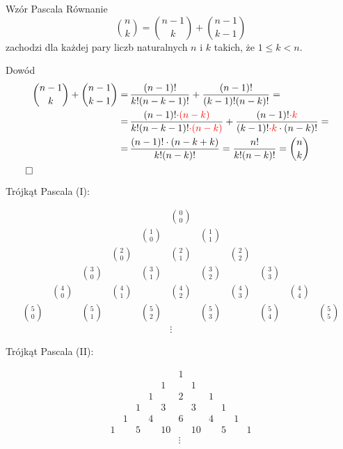 \documentclass[a4paper,10pt]{beamer}
\begin{document}
\begin{frame}

\begin{block}{Wzór Pascala}
Równanie
$${n\choose k}={n-1\choose k}+{n-1\choose k-1}$$
zachodzi dla każdej pary liczb naturalnych $n$ i $k$ takich, że $1\leqslant k<n$.
\end{block}

\begin{block}{Dowód}
\begin{align*}
{n-1\choose k}+{n-1\choose k-1}=&\,\frac{(n-1)!}{k!(n-k-1)!}+\frac{(n-1)!}{(k-1)!(n-k)!}=\\
=&\,\frac{(n-1)!\textcolor{red}{\cdot(n-k)}}{k!(n-k-1)!\textcolor{red}{\cdot(n-k)}}+\frac{(n-1)!\textcolor{red}{\cdot k}}{(k-1)!\textcolor{red}{\cdot k}\cdot(n-k)!}=\\
=&\,\frac{(n-1)!\cdot (n-k+k)}{k!(n-k)!}=\frac{n!}{k!(n-k)!}={n\choose k}\\
\end{align*}\hfill$\qed$
\end{block}

\end{frame}



\begin{frame}
Trójkąt Pascala (I):

$$\begin{array}{ccccccccccc}
&&&&&{0\choose0}&&&&&\\
&&&&{1\choose0}&&{1\choose1}&&&&\\
&&&{2\choose0}&&{2\choose1}&&{2\choose2}&&&\\
&&{3\choose0}&&{3\choose1}&&{3\choose2}&&{3\choose3}&&\\
&{4\choose0}&&{4\choose1}&&{4\choose2}&&{4\choose3}&&{4\choose4}&\\
{5\choose0}&&{5\choose1}&&{5\choose2}&&{5\choose3}&&{5\choose4}&&{5\choose5}\\
&&&&&\vdots&&&&&
\end{array}$$

\bigskip

Trójkąt Pascala (II):

$$\begin{array}{ccccccccccc}
&&&&&1&&&&&\\
&&&&1&&1&&&&\\
&&&1&&2&&1&&&\\
&&1&&3&&3&&1&&\\
&1&&4&&6&&4&&1&\\
1&&5&&10&&10&&5&&1\\
&&&&&\vdots&&&&&
\end{array}
$$

\end{frame}
\end{document}
